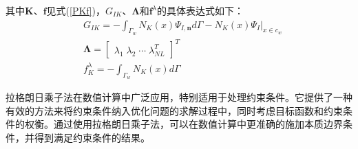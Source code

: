 其中$\pmb{K}$、$\pmb{f}$见式(\ref{PKf})，$G_{IK}$、$\pmb{\Lambda}$和$\pmb{f}^{\lambda}$的具体表达式如下：
\begin{equation}
\begin{split}
    &G_{I\!K}=-\int_{\Gamma_w}N_K(x)\Psi_{I,\pmb n}d\Gamma-N_K(x)\Psi_I\vert_{x\in c_w}\\
    &\pmb{\Lambda}= \left[\begin{matrix}\lambda_1\;\lambda_2\;\dotsb\;\lambda_{NL}^T\end{matrix}\right]^T\\
    &f_K^{\lambda}=-\int_{\Gamma_w}N_K(x)d\Gamma
\end{split}
\end{equation}\par
拉格朗日乘子法在数值计算中广泛应用，特别适用于处理约束条件。它提供了一种有效的方法来将约束条件纳入优化问题的求解过程中，同时考虑目标函数和约束条件的权衡。通过使用拉格朗日乘子法，可以在数值计算中更准确的施加本质边界条件，并得到满足约束条件的结果。
